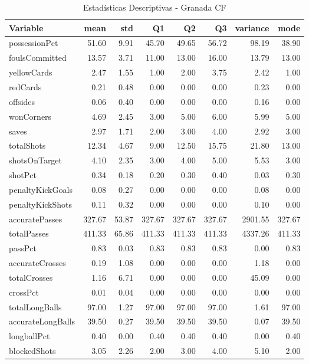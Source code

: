 \begin{table}[H]
\centering
\caption{Estadísticas Descriptivas - Granada CF}
\label{tab:esp_granada_cf}
\small
\begin{tabular}{lrrrrrrr}
\hline
Variable & mean & std & Q1 & Q2 & Q3 & variance & mode \\
\hline
possessionPct & 51.60 & 9.91 & 45.70 & 49.65 & 56.72 & 98.19 & 38.90 \\
foulsCommitted & 13.57 & 3.71 & 11.00 & 13.00 & 16.00 & 13.79 & 13.00 \\
yellowCards & 2.47 & 1.55 & 1.00 & 2.00 & 3.75 & 2.42 & 1.00 \\
redCards & 0.21 & 0.48 & 0.00 & 0.00 & 0.00 & 0.23 & 0.00 \\
offsides & 0.06 & 0.40 & 0.00 & 0.00 & 0.00 & 0.16 & 0.00 \\
wonCorners & 4.69 & 2.45 & 3.00 & 5.00 & 6.00 & 5.99 & 5.00 \\
saves & 2.97 & 1.71 & 2.00 & 3.00 & 4.00 & 2.92 & 3.00 \\
totalShots & 12.34 & 4.67 & 9.00 & 12.50 & 15.75 & 21.80 & 13.00 \\
shotsOnTarget & 4.10 & 2.35 & 3.00 & 4.00 & 5.00 & 5.53 & 3.00 \\
shotPct & 0.34 & 0.18 & 0.20 & 0.30 & 0.40 & 0.03 & 0.30 \\
penaltyKickGoals & 0.08 & 0.27 & 0.00 & 0.00 & 0.00 & 0.08 & 0.00 \\
penaltyKickShots & 0.11 & 0.32 & 0.00 & 0.00 & 0.00 & 0.10 & 0.00 \\
accuratePasses & 327.67 & 53.87 & 327.67 & 327.67 & 327.67 & 2901.55 & 327.67 \\
totalPasses & 411.33 & 65.86 & 411.33 & 411.33 & 411.33 & 4337.26 & 411.33 \\
passPct & 0.83 & 0.03 & 0.83 & 0.83 & 0.83 & 0.00 & 0.83 \\
accurateCrosses & 0.19 & 1.08 & 0.00 & 0.00 & 0.00 & 1.18 & 0.00 \\
totalCrosses & 1.16 & 6.71 & 0.00 & 0.00 & 0.00 & 45.09 & 0.00 \\
crossPct & 0.01 & 0.04 & 0.00 & 0.00 & 0.00 & 0.00 & 0.00 \\
totalLongBalls & 97.00 & 1.27 & 97.00 & 97.00 & 97.00 & 1.61 & 97.00 \\
accurateLongBalls & 39.50 & 0.27 & 39.50 & 39.50 & 39.50 & 0.07 & 39.50 \\
longballPct & 0.40 & 0.00 & 0.40 & 0.40 & 0.40 & 0.00 & 0.40 \\
blockedShots & 3.05 & 2.26 & 2.00 & 3.00 & 4.00 & 5.10 & 2.00 \\

\end{tabular}
\end{table}
